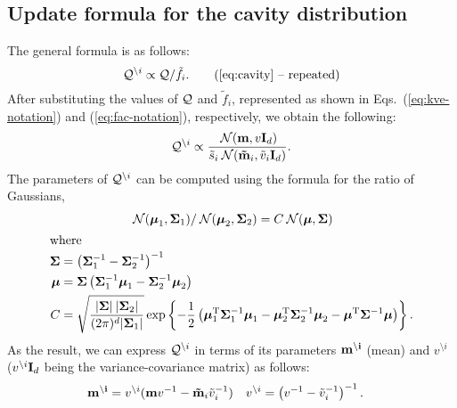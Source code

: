 \documentclass[11pt]{article}
\begin{document}
\subsection*{Update formula for the cavity distribution}
The general formula is as follows:
\begin{equation}
	\kve^{\setminus i} \propto \kve / \tilde{f}_i.
	\tag{\ref{eq:cavity} -- repeated}
\end{equation}
After substituting the values of $\mathcal{Q}$ and $\tilde{f}_i$, represented as 
shown in Eqs.~(\ref{eq:kve-notation}) and (\ref{eq:fac-notation}), 
respectively, we obtain the following:
\begin{equation}
	\mathcal{Q}^{\setminus i} \propto \frac{\:\mathcal{N}(\mathbf{m}, v\mathbf{I}_{d})}
		{\tilde{s}_i\:\mathcal{N}(\mathbf{\tilde{m}}_i, \tilde{v}_i\mathbf{I}_{d})}.
\end{equation}
The parameters of $\mathcal{Q}^{\setminus i}$ can be computed using the formula 
for the ratio of Gaussians,
\begin{gather}
	\:\mathcal{N}(\mathbf{\boldsymbol{\mu}}_1, \mathbf{\Sigma}_1)/\:\mathcal{N}(\mathbf{\boldsymbol{\mu}}_2, \mathbf{\Sigma}_2) 
	= C\:\mathcal{N}(\mathbf{\boldsymbol{\mu}}, \mathbf{\Sigma})\\
\intertext{where}
	\begin{aligned}
		\mathbf{\Sigma} &= \left(\mathbf{\Sigma}_1^{-1} 
			- \mathbf{\Sigma}_2^{-1}\right)^{-1} \\
		\mathbf{\boldsymbol{\mu}} &= \mathbf{\Sigma}\left(\mathbf{\Sigma}_1^{-1}\mathbf{\boldsymbol{\mu}}_1
			- \mathbf{\Sigma}_2^{-1}\mathbf{\boldsymbol{\mu}}_2\right) \\
		C &= \sqrt{\frac{|\mathbf{\Sigma}|\:|\mathbf{\Sigma}_2|}
									 {(2\pi)^d|\mathbf{\Sigma}_1|}}
				\exp\left\{-\frac{1}{2}\left(
						\mathbf{\boldsymbol{\mu}}_1^{\mathrm{T}}\mathbf{\Sigma}_1^{-1}\mathbf{\boldsymbol{\mu}}_1
						- \mathbf{\boldsymbol{\mu}}_2^{\mathrm{T}}\mathbf{\Sigma}_2^{-1}\mathbf{\boldsymbol{\mu}}_2 
						- \mathbf{\boldsymbol{\mu}}^{\mathrm{T}}\mathbf{\Sigma}^{-1}\mathbf{\boldsymbol{\mu}}
						\right)\right\}.
	\end{aligned}
\end{gather}
As the result, we can express $\mathcal{Q}^{\setminus i}$ in terms of its 
parameters $\mathbf{m^{\setminus i}}$ (mean) and $v^{\setminus i}$ 
($v^{\setminus i}\mathbf{I}_{d}$ being the variance-covariance matrix) as follows:
\begin{align}
	\vek{m^{\setminus i}} &= v^{\setminus i}(\vek{m}v^{-1} 
	- \vek{\tilde{m}}_i\tilde{v}_i^{-1}) &%
	 v^{\setminus i} &= \left(v^{-1} - \tilde{v}_i^{-1}\right)^{-1}.
\end{align}
\end{document}
